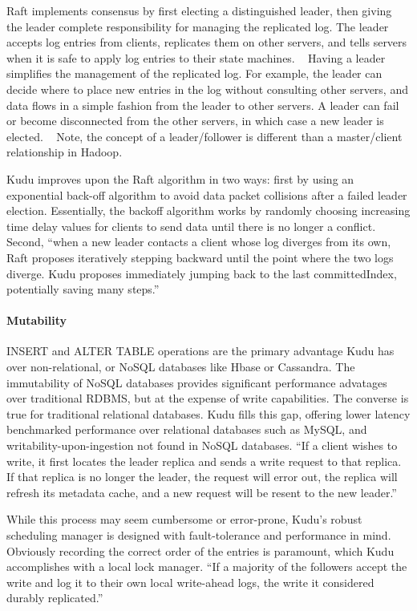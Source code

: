 Raft implements consensus by first electing a distinguished leader,
then giving the leader complete responsibility for managing the
replicated log. The leader accepts log entries from clients,
replicates them on other servers, and tells servers when it is safe
to apply log entries to their state machines. ~\cite{hid-sp18-407-raft-algo}
Having a leader simplifies the management of the replicated log. For example, the
leader can decide where to place new entries in the log without
consulting other servers, and data flows in a simple fashion from the
leader to other servers. A leader can fail or become disconnected
from the other servers, in which case a new leader is elected.  ~\cite{hid-sp18-407-raft-algo} Note, the concept of a leader/follower is different than a
master/client relationship in Hadoop. 

Kudu improves upon the Raft algorithm in two ways: first by using an
exponential back-off algorithm to avoid data packet collisions after
a failed leader election. Essentially, the backoff algorithm works by
randomly choosing increasing time delay values for clients to send
data until there is no longer a conflict. Second, ``when a new leader
contacts a client whose log diverges from its own, Raft proposes
iteratively stepping backward until the point where the two logs
diverge. Kudu proposes immediately jumping back to the last
committedIndex, potentially saving many steps.''
~\cite{hid-sp18-407-kudu-intro}

\paragraph{Mutability} 
INSERT and ALTER TABLE operations are the primary advantage Kudu has
over non-relational, or NoSQL databases like Hbase or Cassandra. The
immutability of NoSQL databases provides significant performance
advatages over traditional RDBMS, but at the expense of write
capabilities. The converse is true for traditional relational
databases.  Kudu fills this gap, offering lower latency benchmarked
performance over relational databases such as MySQL, and
writability-upon-ingestion not found in NoSQL databases.
``If a client wishes to write, it first locates the leader replica and sends a write request to that replica. If that replica is no longer the leader, the request will error out, the replica will refresh its metadata cache, and a new request will be resent to the
new leader.'' ~\cite{hid-sp18-407-kudu-intro}

While this process may seem cumbersome or error-prone, Kudu's robust
scheduling manager is designed with fault-tolerance and performance
in mind. Obviously recording the correct order of the entries is
paramount, which Kudu accomplishes with a local lock manager.  ``If a
majority of the followers accept the write and log it to their own
local write-ahead logs, the write it considered durably replicated.'' ~\cite{hid-sp18-407-kudu-intro}

